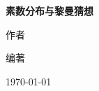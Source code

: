 \thispagestyle{empty}
\begin{titlepage}
\centering
\vspace*{2.8cm}

{\Huge\bfseries 素数分布与黎曼猜想\par}

\vfill

{\Large 作者\par}
\vspace{0.35cm}
{\large 编著\par}

\vspace{0.5cm}

{\normalsize \today\par}

\vspace{1.8cm}
\end{titlepage}

\clearpage
